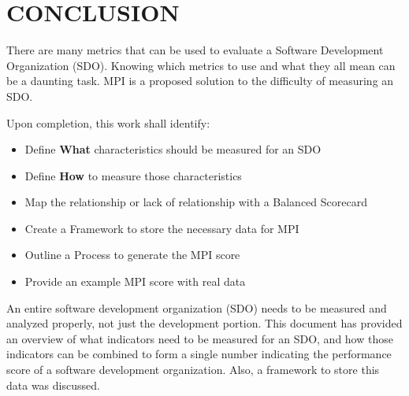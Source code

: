 \documentclass[SDSUThesis.tex]{subfiles}
\begin{document}
\section{CONCLUSION}

There are many metrics that can be used to evaluate a Software Development Organization (SDO). 
Knowing which metrics to use and what they all mean can be a daunting task.  MPI is a
proposed solution to the difficulty of measuring an SDO.

Upon completion, this work shall identify:
\begin{itemize}
    \item Define \textbf{What} characteristics should be measured for an SDO
    \item Define \textbf{How} to measure those characteristics
    \item Map the relationship or lack of relationship with a Balanced Scorecard
    \item Create a Framework to store the necessary data for MPI
    \item Outline a Process to generate the MPI score
    \item Provide an example MPI score with real data
\end{itemize}

An entire software development organization (SDO) needs to be measured and analyzed properly, not just the development portion. This document has provided an overview of what indicators need to be measured for an SDO, and how those indicators can be combined to form a single number indicating the performance score of a software development organization.  Also, a framework to store this data was discussed.
\end{document}

